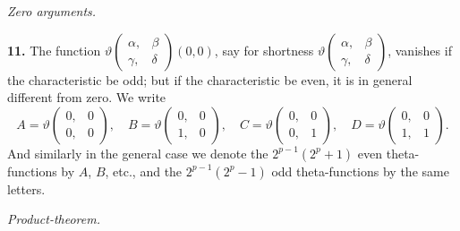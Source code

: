 \documentclass[11pt,a4paper]{book}
\begin{document}
\vspace{1em}

\begin{center}
\textit{Zero arguments.}
\end{center}

\vspace{0.5em}

\noindent\textbf{11.}\quad
The function $\vartheta\begin{pmatrix} \alpha, & \beta \\ \gamma, & \delta \end{pmatrix}(0, 0)$, say for shortness $\vartheta\begin{pmatrix} \alpha, & \beta \\ \gamma, & \delta \end{pmatrix}$, vanishes if the characteristic be odd; but if the characteristic be even, it is in general different from zero. We write
\[
A = \vartheta\begin{pmatrix} 0, & 0 \\ 0, & 0 \end{pmatrix},\quad
B = \vartheta\begin{pmatrix} 0, & 0 \\ 1, & 0 \end{pmatrix},\quad
C = \vartheta\begin{pmatrix} 0, & 0 \\ 0, & 1 \end{pmatrix},\quad
D = \vartheta\begin{pmatrix} 0, & 0 \\ 1, & 1 \end{pmatrix}.
\]
And similarly in the general case we denote the $2^{p-1}(2^p + 1)$ even theta-functions by $A$, $B$, etc., and the $2^{p-1}(2^p - 1)$ odd theta-functions by the same letters.

\vspace{1em}

\begin{center}
\textit{Product-theorem.}
\end{center}

\vspace{0.5em}
\end{document}
